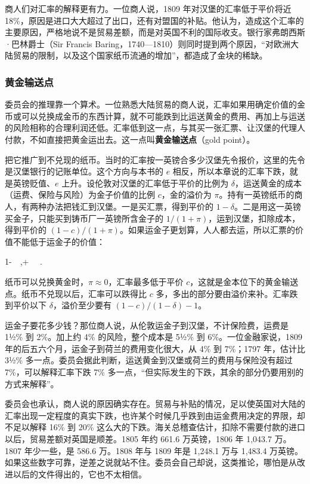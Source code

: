商人们对汇率的解释更有力。一位商人说，1809 年对汉堡的汇率低于平价将近 18\%，原因是进口大大超过了出口，还有对盟国的补贴。他认为，造成这个汇率的主要原因，严格地说不是贸易差额，而是对英国不利的国际收支\cite{bullion1810}。银行家弗朗西斯·巴林爵士（Sir Francis Baring，1740—1810）则同时提到两个原因，“对欧洲大陆贸易的限制，以及这个国家纸币流通的增加”，都造成了金块的稀缺\cite{bullion1810}。

\subsubsection{黄金输送点}
委员会的推理靠一个算术。一位熟悉大陆贸易的商人说，汇率如果用确定价值的金币或可以兑换成金币的东西计算，就不可能跌到比运送黄金的费用、再加上与运送的风险相称的合理利润还低\cite{bullion1810}。汇率低到这一点，与其买一张汇票、让汉堡的代理人付款，不如直接把黄金运出去。这一点叫\textbf{黄金输送点}（gold point）。

把它推广到不兑现的纸币。当时的汇率按一英镑合多少汉堡先令报价，这里的先令是汉堡银行的记账单位。这个方向与本书的 $e$ 相反，所以本章说的汇率下跌，就是英镑贬值、$e$ 上升。设伦敦对汉堡的汇率低于平价的比例为 $\delta$，运送黄金的成本（运费、保险与风险）为金子价值的比例 $c$，金的溢价为 $\pi$。持有一英镑纸币的商人，有两种办法把钱汇到汉堡。一是买汇票，得到平价的 $1-\delta$。二是用这一英镑买金子，只能买到铸币厂一英镑所含金子的 $1/(1+\pi)$，运到汉堡，扣除成本，得到平价的 $(1-c)/(1+\pi)$。如果运金子更划算，人人都去运，所以汇票的价值不能低于运金子的价值：
\begin{keyeq}
1-\delta\ \ge\ ,\qquad{}+\pi\ \ge\  .\label{eq:bullion-goldpoint}
\end{keyeq}
纸币可以兑换黄金时，$\pi\approx0$，汇率最多低于平价 $c$，这就是金本位下的黄金输送点。纸币不兑现以后，汇率可以跌得比 $c$ 多，多出的部分要由溢价来补。汇率跌到平价以下 $\delta$，溢价至少要有 $(1-c)/(1-\delta)-1$。

运金子要花多少钱？那位商人说，从伦敦运金子到汉堡，不计保险费，运费是 1½\% 到 2\%。加上约 4\% 的风险，整个成本是 5½\% 到 6\%。一位金融家说，1809 年的后五六个月，运金子到荷兰的费用变化很大，从 4\% 到 7\%；1797 年，估计比 3½\% 多一点\cite{bullion1810}。委员会据此判断，运送黄金到汉堡或荷兰的费用与保险没有超过 7\%，可以解释汇率下跌 7\% 多一点，“但实际发生的下跌，其余的部分仍要用别的方式来解释”\cite{bullion1810}。

委员会也承认，商人说的原因确实存在。贸易与补贴的情况，足以使英国对大陆的汇率出现一定程度的真实下跌，也许某个时候几乎跌到由运金费用决定的界限，却不足以解释 16\% 到 20\% 这么大的下跌\cite{bullion1810}。海关总稽查估计，扣除不需要付款的进口以后，贸易差额对英国是顺差。1805 年约 661.6 万英镑，1806 年 1,043.7 万。1807 年少一些，是 586.6 万。1808 年与 1809 年是 1,248.1 万与 1,483.4 万英镑\cite{bullion1810}。如果这些数字可靠，逆差之说就站不住。委员会自己却说，这类推论，哪怕是从改进以后的文件得出的，它也不太相信\cite{bullion1810}。

